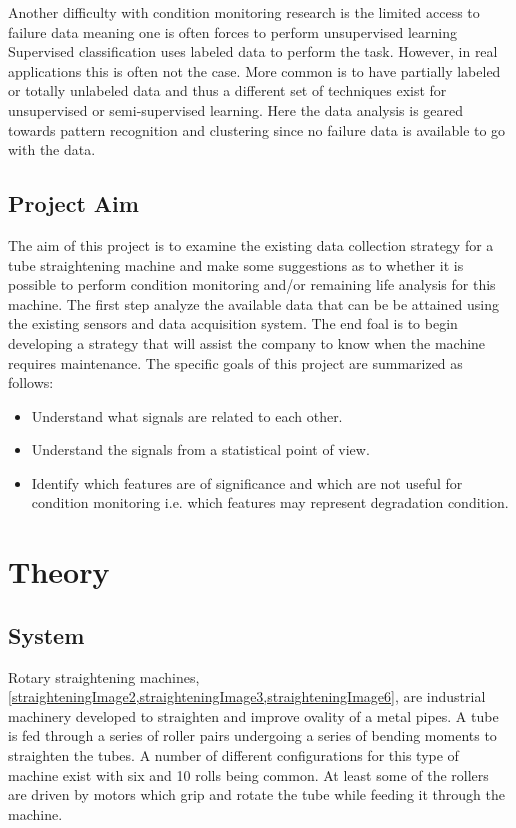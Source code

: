 \documentclass[]{article}
\begin{document}
Another difficulty with condition monitoring research is the limited access to failure data meaning one is often forces to perform unsupervised learning
Supervised classification uses labeled data to perform the task. However, in real applications this is often not the case. More common is to have partially labeled or totally unlabeled data and thus a different set of techniques exist for unsupervised or semi-supervised learning. Here the data analysis is geared towards pattern recognition and clustering since no failure data is available to go with the data.

\subsection{Project Aim}
The aim of this project is to examine the existing data collection strategy for a tube straightening machine and make some suggestions as to whether it is possible to perform condition monitoring and/or remaining life analysis for this machine. The first step analyze the available data that can be be attained using the existing sensors and data acquisition system. The end foal is to begin developing a strategy that will assist the company to know when the machine requires maintenance. The specific goals of this project are summarized as follows:
\begin{itemize}
\item Understand what signals are related to each other.
\item Understand the signals from a statistical point of view.
\item Identify which features are of significance and which are not useful for condition monitoring i.e. which features may represent degradation condition.
\end{itemize}
\clearpage  
\section{Theory}
\subsection{System}
Rotary straightening machines, \cref{straighteningImage2,straighteningImage3,straighteningImage6}, are industrial machinery developed to straighten and improve ovality of a metal pipes. A tube is fed through a series of roller pairs undergoing a series of bending moments to straighten the tubes. A number of different configurations for this type of machine exist with six and 10 rolls being common. At least some of the rollers are driven by motors which grip and rotate the tube while feeding it through the machine.
\end{document}

